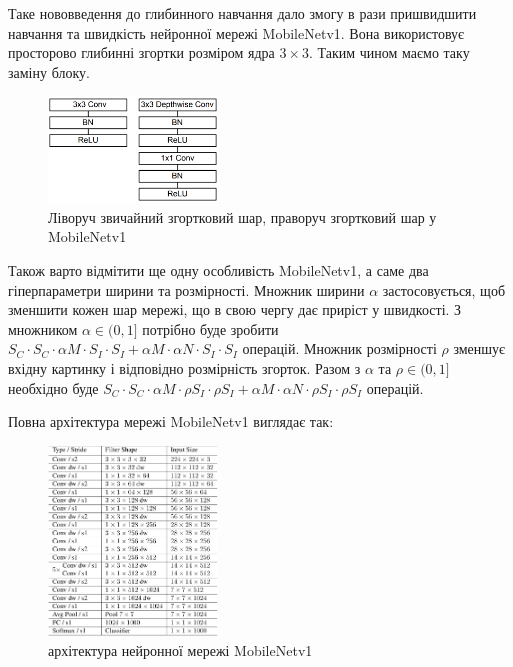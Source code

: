 Таке нововведення до глибинного навчання дало змогу в рази пришвидшити
навчання та швидкість нейронної мережі MobileNetv1. Вона використовує
просторово глибинні згортки розміром ядра $3 \times 3$.
Таким чином маємо таку заміну блоку.

\begin{figure}[H]
    \centering
    \includegraphics[width=0.4\textwidth]{images/cnn_mobilenetv1_conv_layer}
    \caption{Ліворуч звичайний згортковий шар, праворуч згортковий шар у MobileNetv1
        \label{fig:cnn:mobilenetv1_conv_layer}
    }
\end{figure}

Також варто відмітити ще одну особливість MobileNetv1, а саме два гіперпараметри
ширини та розмірності.
Множник ширини $\alpha$ застосовується, щоб зменшити кожен шар мережі, що
в свою чергу дає приріст у швидкості.
З множником  $\alpha \in (0,1]$ потрібно буде зробити
$S_C · S_C · \alpha M · S_I · S_I + \alpha M · \alpha N · S_I · S_I$ операцій.
Множник розмірності $\rho$ зменшує вхідну картинку і відповідно
розмірність згорток. Разом з $\alpha$  та $\rho \in (0,1]$ необхідно буде
$S_C · S_C · \alpha M · \rho S_I · \rho S_I + \alpha M ·\alpha  N · \rho S_I · \rho S_I$
операцій.

Повна архітектура мережі MobileNetv1 виглядає так:

\begin{figure}[H]
    \centering
    \includegraphics[width=0.4\textwidth]{images/cnn_mobilenetv1_architecture}
    \caption{архітектура нейронної мережі MobileNetv1
        \label{fig:cnn:mobilenetv1_architecture}
    }
\end{figure}


